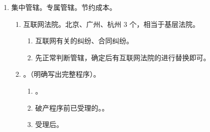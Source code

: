 \begin{enumerate}
\begin{enumerate}
\begin{enumerate}
                  \item 纠错纠错单方行为。不需要移送法院同意，和级别、地域都没关系。
                  \item 纠错纠错一次就好。不允许退回 \hz 再移送 \yjt 只能报上级指定管辖。。
                \end{enumerate}
          \item 指定管辖。
                \begin{enumerate}
                  \item 有管辖权法院由于特殊原因不能行使管辖权。
                  \item 移送管辖中受移送法院认为自己没有管辖权。
                  \item 大家都能管 \yjt 协商 \yjt 层报共同上级。。
                \end{enumerate}
          \item {}。上下级法院之间，对级别管辖的调整和变通。
                \begin{enumerate}
                  \item 上可以审下。\yi 搞不定、新类型等。\er 下认为上审更合适 \yjt 上级直接下裁定 \hz 下级报上级同意。
                  \item 上移下。 \yjt 交下级法院审理。
                \end{enumerate}
        \end{enumerate}
  \item 集中管辖。\bdy 专属管辖。节约成本。
        \begin{enumerate}
          \item 互联网法院。北京、广州、杭州 3 个，相当于基层法院。
                \begin{enumerate}
                  \item 互联网有关的纠纷、合同纠纷。
                  \item 先正常判断管辖，确定后有互联网法院的进行替换即可。
                \end{enumerate}
          \item {}。（明确写出完整程序）。
                \begin{enumerate}
                  \item {}。
                  \item 破产程序前已受理的。。
                  \item 受理后。

\end{enumerate}
\end{enumerate}
\end{enumerate}

